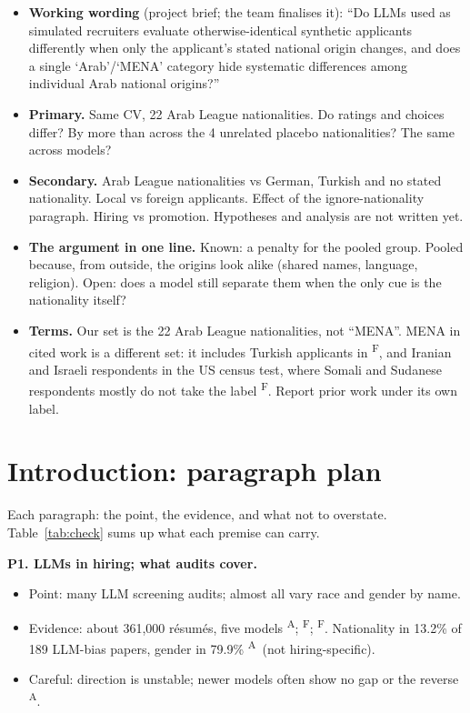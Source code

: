 \documentclass[11pt]{article}
\newcommand{\vF}{\textsuperscript{F}} %
\newcommand{\vA}{\textsuperscript{A}} %
\newcommand{\slot}[1]{\textbf{#1}}
\newcommand{\para}[1]{\smallskip\noindent\textbf{#1}}
\begin{document}
\begin{itemize}
\item \slot{Working wording} (project brief; the team finalises it): ``Do LLMs used as simulated recruiters evaluate otherwise-identical synthetic applicants differently when only the applicant's stated national origin changes, and does a single `Arab'/`MENA' category hide systematic differences among individual Arab national origins?''
\item \slot{Primary.} Same CV, 22 Arab League nationalities. Do ratings and choices differ? By more than across the 4 unrelated placebo nationalities? The same across models?
\item \slot{Secondary.} Arab League nationalities vs German, Turkish and no stated nationality. Local vs foreign applicants. Effect of the ignore-nationality paragraph. Hiring vs promotion. Hypotheses and analysis are not written yet.
\item \slot{The argument in one line.} Known: a penalty for the pooled group. Pooled because, from outside, the origins look alike (shared names, language, religion). Open: does a model still separate them when the only cue is the nationality itself?
\item \slot{Terms.} Our set is the 22 Arab League nationalities, not ``MENA''. MENA in cited work is a different set: it includes Turkish applicants in \citet{quillian2023trends}\vF, and Iranian and Israeli respondents in the US census test, where Somali and Sudanese respondents mostly do not take the label \citep{mathews2017national}\vF. Report prior work under its own label.
\end{itemize}

\section{Introduction: paragraph plan}

Each paragraph: the point, the evidence, and what not to overstate. Table~\ref{tab:check} sums up what each premise can carry.

\para{P1. LLMs in hiring; what audits cover.}
\begin{itemize}
\item Point: many LLM screening audits; almost all vary race and gender by name.
\item Evidence: about 361,000 r\'esum\'es, five models \citep{an2025measuring}\vA; \citet{gaebler2024auditing}\vF; \citet{armstrong2024silicon}\vF. Nationality in 13.2\% of 189 LLM-bias papers, gender in 79.9\% \citep{ghosh2025bias}\vA\ (not hiring-specific).
\item Careful: direction is unstable; newer models often show no gap or the reverse \citep{gao2026can}\vA.
\end{itemize}
\end{document}

